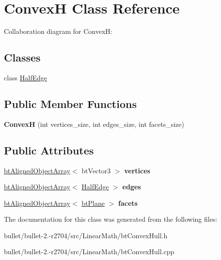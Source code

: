 \hypertarget{class_convex_h}{\section{Convex\+H Class Reference}
\label{class_convex_h}
}


Collaboration diagram for Convex\+H\+:
\subsection*{Classes}
\begin{DoxyCompactItemize}
\item 
class \hyperlink{class_convex_h_1_1_half_edge}{Half\+Edge}
\end{DoxyCompactItemize}
\subsection*{Public Member Functions}
\begin{DoxyCompactItemize}
\item 
\hypertarget{class_convex_h_a6eb50c88208f9acfcbeccdda32d4d516}{{\bfseries Convex\+H} (int vertices\+\_\+size, int edges\+\_\+size, int facets\+\_\+size)}\label{class_convex_h_a6eb50c88208f9acfcbeccdda32d4d516}

\end{DoxyCompactItemize}
\subsection*{Public Attributes}
\begin{DoxyCompactItemize}
\item 
\hypertarget{class_convex_h_a9e9aea19859097ea12128be2062adf1c}{\hyperlink{classbt_aligned_object_array}{bt\+Aligned\+Object\+Array}$<$ bt\+Vector3 $>$ {\bfseries vertices}}\label{class_convex_h_a9e9aea19859097ea12128be2062adf1c}

\item 
\hypertarget{class_convex_h_a33dfd73a41b493aa7f897c484700c6ec}{\hyperlink{classbt_aligned_object_array}{bt\+Aligned\+Object\+Array}$<$ \hyperlink{class_convex_h_1_1_half_edge}{Half\+Edge} $>$ {\bfseries edges}}\label{class_convex_h_a33dfd73a41b493aa7f897c484700c6ec}

\item 
\hypertarget{class_convex_h_a9c1eca9344ab7987a0be01dd3b4ae0f4}{\hyperlink{classbt_aligned_object_array}{bt\+Aligned\+Object\+Array}$<$ \hyperlink{classbt_plane}{bt\+Plane} $>$ {\bfseries facets}}\label{class_convex_h_a9c1eca9344ab7987a0be01dd3b4ae0f4}

\end{DoxyCompactItemize}


The documentation for this class was generated from the following files\+:\begin{DoxyCompactItemize}
\item 
bullet/bullet-\/2.-\/r2704/src/\+Linear\+Math/bt\+Convex\+Hull.\+h\item 
bullet/bullet-\/2.-\/r2704/src/\+Linear\+Math/bt\+Convex\+Hull.\+cpp\end{DoxyCompactItemize}
